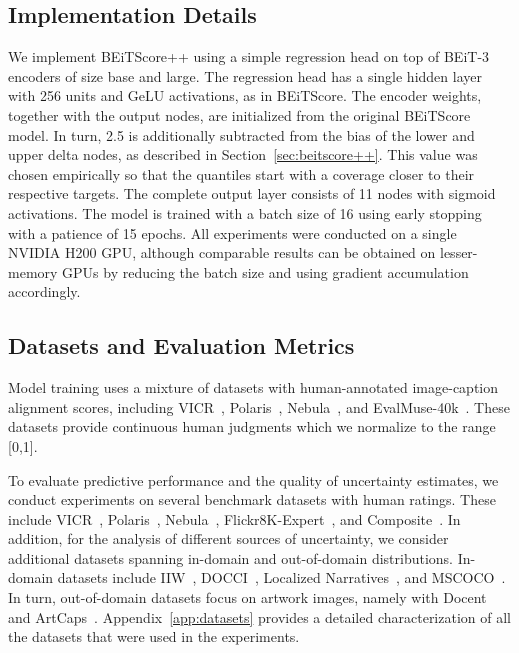 \documentclass[11pt]{article}
\begin{document}
\vspace{-0.13cm}
\subsection{Implementation Details}
\vspace{-0.13cm}

We implement BEiTScore++ using a simple regression head on top of BEiT-3 encoders of size base and large. The regression head has a single hidden layer with 256 units and GeLU activations, as in BEiTScore. The encoder weights, together with the output nodes, are initialized from the original BEiTScore model. In turn, 2.5 is additionally subtracted from the bias of the lower and upper delta nodes, as described in Section~\ref{sec:beitscore++}. This value was chosen empirically so that the quantiles start with a coverage closer to their respective targets. The complete output layer consists of 11 nodes with sigmoid activations. The model is trained with a batch size of 16 using early stopping with a patience of 15 epochs. All experiments were conducted on a single NVIDIA H200 GPU, although comparable results can be obtained on lesser-memory GPUs by reducing the batch size and using gradient accumulation accordingly.

\vspace{-0.13cm}
\subsection{Datasets and Evaluation Metrics}
\vspace{-0.13cm}

Model training uses a mixture of datasets with human-annotated image-caption alignment scores, including VICR~\cite{narins2023validated}, Polaris~\cite{wada2024polos}, Nebula~\cite{matsuda2024deneb}, and EvalMuse-40k~\cite{han2024evalmuse}. These datasets provide continuous human judgments which we normalize to the range [0,1].

To evaluate predictive performance and the quality of uncertainty estimates, we conduct experiments on several benchmark datasets with human ratings. These include VICR~\cite{narins2023validated}, Polaris~\cite{wada2024polos}, Nebula~\cite{matsuda2024deneb}, Flickr8K-Expert~\cite{hodosh2013framing}, and Composite~\cite{aditya2015images}. In addition, for the analysis of different sources of uncertainty, we consider additional datasets spanning in-domain and out-of-domain distributions. In-domain datasets include IIW~\cite{garg2024imageinwords}, DOCCI~\cite{onoe2024docci}, Localized Narratives~\cite{pont2020connecting}, and MSCOCO~\cite{lin2014microsoft}. In turn, out-of-domain datasets focus on artwork images, namely with Docent~\cite{ananthram2025posh} and ArtCaps~\cite{lu2022artcap}. Appendix~\ref{app:datasets} provides a detailed characterization of all the datasets that were used in the experiments.
\end{document}
